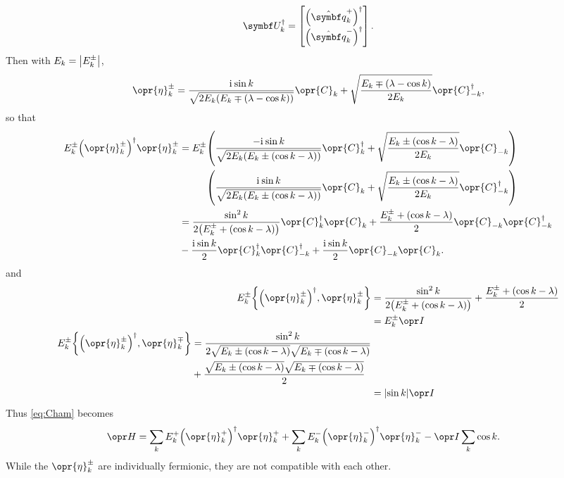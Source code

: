 \documentclass[../thesis.tex]{subfiles}
\begin{document}
\begin{equation}
  \mq{U}_k^\dag
  = \bmqty{%
    {\qty(\hat{\vq{q}}_k^+)}^\dag \\
    {\qty(\hat{\vq{q}}_k^-)}^\dag
  }.
\end{equation}
Then with $E_k = \abs{E_k^\pm}$,
\begin{equation}
  \opr{\eta}_k^\pm
  = \frac{\im\sin k}{\sqrt{2E_k\qty(E_k \mp (\lambda - \cos k))}}
  \opr{C}_k
  + \sqrt{\frac{E_k \mp (\lambda - \cos k)}{2E_k}}
  \opr{C}^\dag_{-k},
\end{equation}
so that
\begin{align}
  E_k^\pm {\qty(\opr{\eta}_k^\pm)}^\dag\opr{\eta}_k^\pm
  &= E_k^\pm
  \qty(%
  \frac{-\im\sin k}{\sqrt{2E_k\qty(E_k \pm (\cos k - \lambda))}}
  \opr{C}_k^\dag
  + \sqrt{\frac{E_k \pm (\cos k - \lambda)}{2E_k}}
  \opr{C}_{-k}
  ) \\
  &\phantom{{}={E_k^\pm}}
  \qty(%
  \frac{\im\sin k}{\sqrt{2E_k\qty(E_k \pm (\cos k - \lambda))}}
  \opr{C}_k
  + \sqrt{\frac{E_k \pm (\cos k - \lambda)}{2E_k}}
  \opr{C}_{-k}^\dag
  )
  \\
  &=
  \frac{\sin^2 k}{2\qty(E_k^\pm + (\cos k - \lambda))}
  \opr{C}_k^\dag \opr{C}_k
  + \frac{E_k^\pm + (\cos k - \lambda)}{2}
  \opr{C}_{-k} \opr{C}_{-k}^\dag \\
  &- \frac{\im\sin k}{2}
  \opr{C}_k^\dag \opr{C}_{-k}^\dag
  + \frac{\im\sin k}{2}
  \opr{C}_{-k} \opr{C}_k.
\end{align}
and
\begin{align}
  E_k^\pm \acomm{{\qty(\opr{\eta}_k^\pm)}^\dag}{\opr{\eta}_k^\pm}
  &= \frac{\sin^2 k}{2\qty(E_k^\pm + (\cos k - \lambda))}
  + \frac{E_k^\pm + (\cos k - \lambda)}{2} \\
  &= E_k^\pm \idopr
  \\
  \begin{split}
  E_k^\pm \acomm{{\qty(\opr{\eta}_k^\pm)}^\dag}{\opr{\eta}_k^\mp}
  &= \frac{\sin^2 k}{2\sqrt{E_k \pm (\cos k - \lambda)}
  \sqrt{E_k \mp (\cos k - \lambda)}} \\
  &+ \frac{\sqrt{E_k \pm (\cos k - \lambda)}\sqrt{E_k \mp (\cos k - \lambda)}}{2}
  \end{split}
  \\
  &= \abs{\sin k} \idopr
\end{align}
Thus \cref{eq:Cham} becomes
\begin{align}
  \ham
  &= \sum_k E_k^+{\qty(\opr{\eta}_k^+)}^\dag\opr{\eta}_k^+
  + \sum_k E_k^-{\qty(\opr{\eta}_k^-)}^\dag\opr{\eta}_k^-
  - \idopr\sum_k \cos k.
\end{align}
While the $\opr{\eta}_k^\pm$ are individually fermionic, they are not compatible
with each other.
\end{document}
